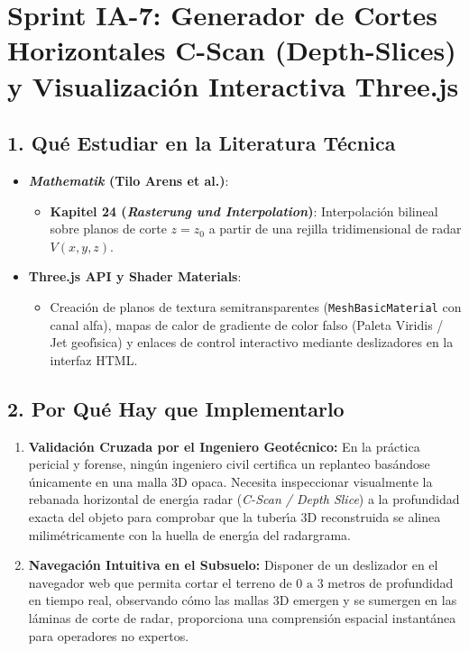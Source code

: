 \documentclass[11pt,a4paper]{article}
\begin{document}
\section{Sprint IA-7: Generador de Cortes Horizontales C-Scan (Depth-Slices) y Visualizaci{\'o}n Interactiva Three.js}

\subsection{1. Qu{\'e} Estudiar en la Literatura T{\'e}cnica}
\begin{itemize}
    \item \textbf{\textit{Mathematik} (Tilo Arens et al.)}:
    \begin{itemize}
        \item \textbf{Kapitel 24 (\textit{Rasterung und Interpolation})}: Interpolaci{\'o}n bilineal sobre planos de corte $z = z_0$ a partir de una rejilla tridimensional de radar $V(x, y, z)$.
    \end{itemize}
    \item \textbf{Three.js API y Shader Materials}:
    \begin{itemize}
        \item Creaci{\'o}n de planos de textura semitransparentes (\texttt{MeshBasicMaterial} con canal alfa), mapas de calor de gradiente de color falso (Paleta Viridis / Jet geof{\'\i}sica) y enlaces de control interactivo mediante deslizadores en la interfaz HTML.
    \end{itemize}
\end{itemize}

\subsection{2. Por Qu{\'e} Hay que Implementarlo}
\begin{enumerate}
    \item \textbf{Validaci{\'o}n Cruzada por el Ingeniero Geot{\'e}cnico:} En la pr{\'a}ctica pericial y forense, ning{\'u}n ingeniero civil certifica un replanteo bas{\'a}ndose {\'u}nicamente en una malla 3D opaca. Necesita inspeccionar visualmente la rebanada horizontal de energ{\'\i}a radar (\textit{C-Scan / Depth Slice}) a la profundidad exacta del objeto para comprobar que la tuber{\'\i}a 3D reconstruida se alinea milim{\'e}tricamente con la huella de energ{\'\i}a del radargrama.
    \item \textbf{Navegaci{\'o}n Intuitiva en el Subsuelo:} Disponer de un deslizador en el navegador web que permita cortar el terreno de $0\text{ a }3\text{ metros}$ de profundidad en tiempo real, observando c{\'o}mo las mallas 3D emergen y se sumergen en las l{\'a}minas de corte de radar, proporciona una comprensi{\'o}n espacial instant{\'a}nea para operadores no expertos.
\end{enumerate}
\end{document}
